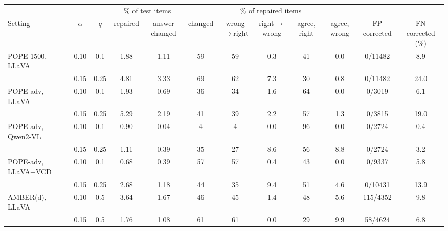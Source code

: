 \begin{tabular}{lccccccccccc}
\toprule
 & & & \multicolumn{2}{c}{\% of test items} & \multicolumn{5}{c}{\% of repaired items} & & \\
\cmidrule(lr){4-5}\cmidrule(lr){6-10}
Setting & $\alpha$ & $q$ & repaired & answer changed & changed & wrong$\to$right & right$\to$wrong & agree, right & agree, wrong & FP corrected & FN corrected (\%)\\
\midrule
POPE-1500, LLaVA & 0.10 & 0.1 & 1.88 & 1.11 & 59 & 59 & 0.3 & 41 & 0.0 & 0/11482 & 8.9\\
 & 0.15 & 0.25 & 4.81 & 3.33 & 69 & 62 & 7.3 & 30 & 0.8 & 0/11482 & 24.0\\
\addlinespace
POPE-adv, LLaVA & 0.10 & 0.1 & 1.93 & 0.69 & 36 & 34 & 1.6 & 64 & 0.0 & 0/3019 & 6.1\\
 & 0.15 & 0.25 & 5.29 & 2.19 & 41 & 39 & 2.2 & 57 & 1.3 & 0/3815 & 19.0\\
\addlinespace
POPE-adv, Qwen2-VL & 0.10 & 0.1 & 0.90 & 0.04 & 4 & 4 & 0.0 & 96 & 0.0 & 0/2724 & 0.4\\
 & 0.15 & 0.25 & 1.11 & 0.39 & 35 & 27 & 8.6 & 56 & 8.8 & 0/2724 & 3.2\\
\addlinespace
POPE-adv, LLaVA+VCD & 0.10 & 0.1 & 0.68 & 0.39 & 57 & 57 & 0.4 & 43 & 0.0 & 0/9337 & 5.8\\
 & 0.15 & 0.25 & 2.68 & 1.18 & 44 & 35 & 9.4 & 51 & 4.6 & 0/10431 & 13.9\\
\addlinespace
AMBER(d), LLaVA & 0.10 & 0.5 & 3.64 & 1.67 & 46 & 45 & 1.4 & 48 & 5.6 & 115/4352 & 9.8\\
 & 0.15 & 0.5 & 1.76 & 1.08 & 61 & 61 & 0.0 & 29 & 9.9 & 58/4624 & 6.8\\
\bottomrule
\end{tabular}
